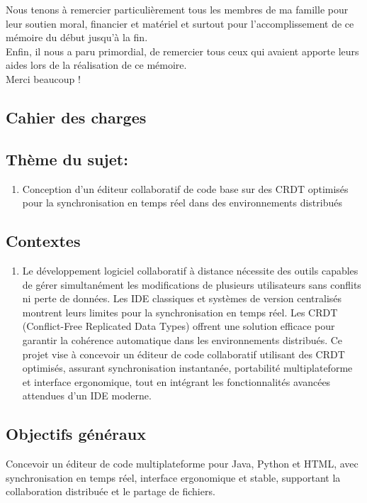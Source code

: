 \documentclass[a4paper,oneside,12pt]{book}
\begin{document}
Nous tenons à remercier particulièrement tous les membres de ma famille pour leur soutien moral, financier et matériel et surtout pour l’accomplissement de ce mémoire du début jusqu’à la fin.\\
Enfin, il nous a paru primordial, de remercier tous ceux qui avaient apporte leurs aides lors de la réalisation de ce mémoire.\\
Merci beaucoup !
\\


\begin{center}
	\chapter*{Cahier des charges}
\end{center}
\section*{Thème du sujet:}
\begin{enumerate}
\item [$\Rightarrow$] {Conception d'un éditeur collaboratif de code base sur des CRDT optimisés pour la synchronisation en temps réel dans des environnements distribués}
\end{enumerate}
\section*{Contextes}
\begin{enumerate}
\item[] Le développement logiciel collaboratif à distance nécessite des outils capables de gérer simultanément les modifications de plusieurs utilisateurs sans conflits ni perte de données. Les IDE classiques et systèmes de version centralisés montrent leurs limites pour la synchronisation en temps réel. Les CRDT (Conflict-Free Replicated Data Types) offrent une solution efficace pour garantir la cohérence automatique dans les environnements distribués. Ce projet vise à concevoir un éditeur de code collaboratif utilisant des CRDT optimisés, assurant synchronisation instantanée, portabilité multiplateforme et interface ergonomique, tout en intégrant les fonctionnalités avancées attendues d’un IDE moderne.
\end{enumerate}
\section*{Objectifs généraux}
Concevoir un éditeur de code multiplateforme pour Java, Python et HTML, avec synchronisation en temps réel, interface ergonomique et stable, supportant la collaboration distribuée et le partage de fichiers.
\end{document}
